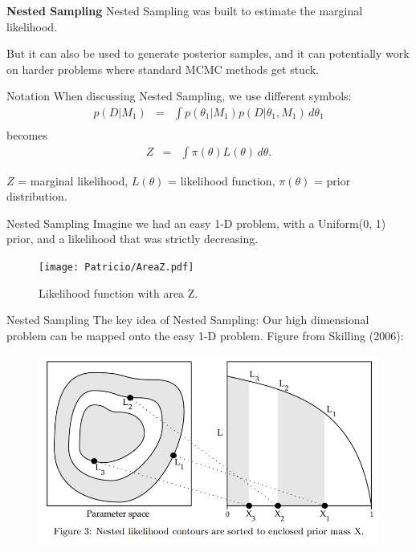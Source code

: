 \begin{frame}{\small{\textbf{Nested Sampling}}}
Nested Sampling was built to estimate the marginal likelihood.

But it can also be used to generate posterior samples, and it can potentially
work on harder problems where standard MCMC methods get stuck.
\end{frame}

\begin{frame}[t]{Notation}
When discussing Nested Sampling, we use different symbols:
\begin{eqnarray*}
p(D | M_1) &=& \int p(\theta_1 | M_1) p(D | \theta_1, M_1) \, d\theta_1\\
\end{eqnarray*}
becomes
\begin{eqnarray*}
Z &=& \int \pi(\theta) L(\theta) \, d\theta.
\end{eqnarray*}

$Z$ = marginal likelihood, $L(\theta)$ = likelihood function, $\pi(\theta)$ = prior
distribution.
\end{frame}


\begin{frame}[t]{Nested Sampling}
Imagine we had an easy 1-D problem, with a Uniform(0, 1) prior, and a likelihood
that was strictly decreasing.

\begin{center}
\begin{figure}
	\texttt{[image: Patricio/AreaZ.pdf]}
\caption{Likelihood function with area Z.}
\end{figure}
\end{center}

\end{frame}


\begin{frame}[t]{Nested Sampling}
The key idea of Nested Sampling: Our high dimensional problem can be mapped
onto the easy 1-D problem. Figure from Skilling (2006):

\begin{figure}
\begin{center}
\includegraphics[scale=0.3]{ns.png}
\end{center}
\end{figure}

\end{frame}


